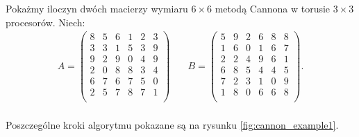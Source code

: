 \clearpage
\begin{przyklad}
Pokażmy iloczyn dwóch macierzy wymiaru \(6 \times 6\) metodą Cannona w torusie \(3\times 3\) procesorów. Niech:
\begin{align*}
A=
\begin{pmatrix}
        8 & 5 & 6 & 1 & 2 & 3 \\
        3 & 3 & 1 & 5 & 3 & 9 \\ 
        9 & 2 & 9 & 0 & 4 & 9 \\ 
        2 & 0 & 8 & 8 & 3 & 4 \\ 
        6 & 7 & 6 & 7 & 5 & 0 \\ 
        2 & 5 & 7 & 8 & 7 & 1 \\
\end{pmatrix} & \quad 
B=
\begin{pmatrix}
        5 & 9 & 2 & 6 & 8 & 8 \\
        1 & 6 & 0 & 1 & 6 & 7 \\ 
        2 & 2 & 4 & 9 & 6 & 1 \\ 
        6 & 8 & 5 & 4 & 4 & 5 \\ 
        7 & 2 & 3 & 1 & 0 & 9 \\ 
        1 & 8 & 0 & 6 & 6 & 8 \\
\end{pmatrix}.\\
\end{align*}


\noindent Poszczególne kroki algorytmu pokazane są na rysunku \ref{fig:cannon_example1}.



\end{przyklad}
